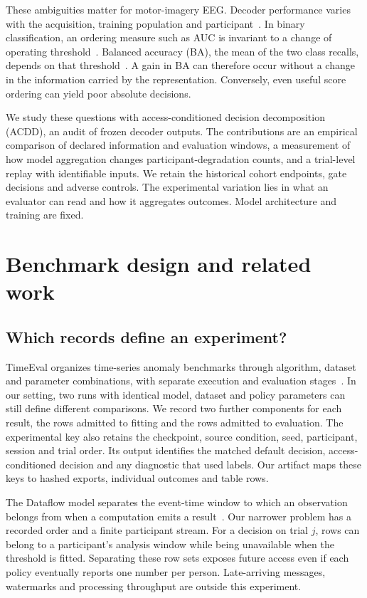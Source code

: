 \documentclass[conference,letterpaper]{IEEEtran}
\begin{document}
These ambiguities matter for motor-imagery EEG. Decoder performance varies with the acquisition, training population and participant~\cite{jayaram2018,eder2024}. In binary classification, an ordering measure such as AUC is invariant to a change of operating threshold~\cite{fawcett2006}. Balanced accuracy (BA), the mean of the two class recalls, depends on that threshold~\cite{brodersen2010}. A gain in BA can therefore occur without a change in the information carried by the representation. Conversely, even useful score ordering can yield poor absolute decisions.

We study these questions with access-conditioned decision decomposition (ACDD), an audit of frozen decoder outputs. The contributions are an empirical comparison of declared information and evaluation windows, a measurement of how model aggregation changes participant-degradation counts, and a trial-level replay with identifiable inputs. We retain the historical cohort endpoints, gate decisions and adverse controls. The experimental variation lies in what an evaluator can read and how it aggregates outcomes. Model architecture and training are fixed.
\section{Benchmark design and related work}\label{sec:benchmark}
\subsection{Which records define an experiment?}
TimeEval organizes time-series anomaly benchmarks through algorithm, dataset and parameter combinations, with separate execution and evaluation stages~\cite{timeeval}. In our setting, two runs with identical model, dataset and policy parameters can still define different comparisons. We record two further components for each result, the rows admitted to fitting and the rows admitted to evaluation. The experimental key also retains the checkpoint, source condition, seed, participant, session and trial order. Its output identifies the matched default decision, access-conditioned decision and any diagnostic that used labels. Our artifact maps these keys to hashed exports, individual outcomes and table rows.

The Dataflow model separates the event-time window to which an observation belongs from when a computation emits a result~\cite{dataflow}. Our narrower problem has a recorded order and a finite participant stream. For a decision on trial $j$, rows can belong to a participant's analysis window while being unavailable when the threshold is fitted. Separating these row sets exposes future access even if each policy eventually reports one number per person. Late-arriving messages, watermarks and processing throughput are outside this experiment.
\end{document}
